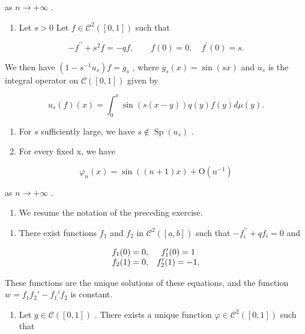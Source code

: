 as \(n \rightarrow +\infty\) .

\begin{enumerate}
\def\labelenumi{\alph{enumi})}
\setcounter{enumi}{1}
\tightlist
\item
  Let \(s > 0\) Let \(f \in \mathcal{C}^2([0,1])\) such that
\end{enumerate}

\[
- f ^ {\prime \prime} + s ^ {2} f = - q f, \qquad f (0) = 0, \quad f ^ {\prime} (0) = s.
\]

We then have \((1-s^{-1}u_{s})f=g_{s}\) , where \(g_{s}(x)=\sin(sx)\) and \(u_{s}\) is the integral operator on \(\mathcal{C}([0,1])\) given by

\[
u _ {s} (f) (x) = \int_ {0} ^ {x} \sin (s (x - y)) q (y) f (y) d \mu (y).
\]

\begin{enumerate}
\def\labelenumi{\alph{enumi})}
\setcounter{enumi}{2}
\item
  For \(s\) sufficiently large, we have \(s \notin \operatorname{Sp}(u_s)\) .
\item
  For every fixed x, we have
\end{enumerate}

\[
\varphi_ {n} (x) = \sin ((n + 1) x) + \mathrm{O} (n ^ {- 1})
\]

as \(n \rightarrow +\infty\) .

\begin{enumerate}
\def\labelenumi{\arabic{enumi})}
\setcounter{enumi}{21}
\tightlist
\item
  We resume the notation of the preceding exercise.
\end{enumerate}

\begin{enumerate}
\def\labelenumi{\alph{enumi})}
\tightlist
\item
  There exist functions \(f_{1}\) and \(f_{2}\) in \(\mathcal{C}^{2}([a,b])\) such that \(-f_{i}^{\prime\prime} + qf_{i} = 0\) and
\end{enumerate}

\[
\begin{array}{c c} f _ {1} (0) = 0, & f _ {1} ^ {\prime} (0) = 1 \\ f _ {2} (1) = 0, & f _ {2} ^ {\prime} (1) = - 1. \end{array}
\]

These functions are the unique solutions of these equations, and the function \(w = f_{1}f_{2}' - f_{1}'f_{2}\) is constant.

\begin{enumerate}
\def\labelenumi{\alph{enumi})}
\setcounter{enumi}{1}
\tightlist
\item
  Let \(g \in \mathcal{C}([0,1])\) . There exists a unique function \(\varphi \in \mathcal{C}^2([0,1])\) such that
\end{enumerate}

